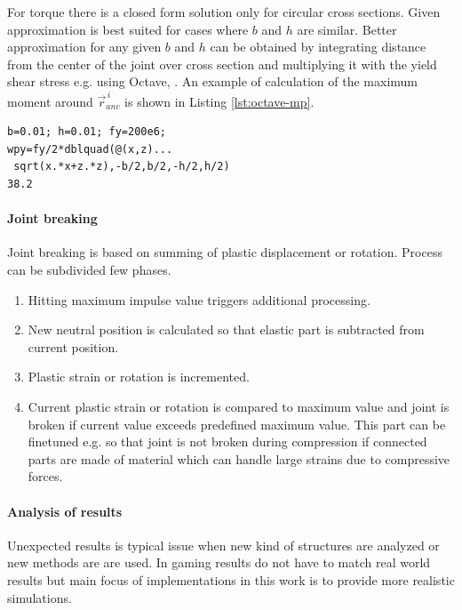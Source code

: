\documentclass{jcgt}
\begin{document}
For torque there is a closed form solution only for
circular cross sections.
Given approximation is 
best suited for cases where $b$ and $h$ are similar.
Better approximation for any given $b$ and $h$ can be obtained 
by integrating distance from the center of the joint over cross section and
multiplying it with the yield shear stress e.g. using Octave, \cite{octave}.
An example of calculation of the maximum moment  around $\vec{r}_{anc}^{\,i} $
is shown in Listing \ref{lst:octave-mp}.

\lstset{language=octave}
\begin{lstlisting}[caption={Calculation of maximum moment  around $\vec{r}_{anc}^{\,i} $ using Octave.}, 
label={lst:octave-mp}, float]
b=0.01; h=0.01; fy=200e6;
wpy=fy/2*dblquad(@(x,z)...
 sqrt(x.*x+z.*z),-b/2,b/2,-h/2,h/2)
38.2
\end{lstlisting}


\paragraph{Joint breaking}
Joint breaking is based on summing of plastic displacement or rotation.
Process can be subdivided few phases.

\begin{enumerate}
\item Hitting maximum impulse value triggers additional processing.
\item New neutral position is calculated so that elastic part is subtracted from current position.
\item Plastic strain or rotation is incremented.
\item Current plastic strain or rotation is compared to maximum value and joint is broken if 
current value exceeds predefined maximum value. This part can be finetuned e.g. so that joint is 
not broken during compression if connected parts are made of material which can handle large
strains due to compressive forces. 
\end{enumerate}

\paragraph{Analysis of results}
Unexpected results is typical issue when new kind of structures are analyzed or new methods are are
used. In gaming results do not have to match real world results but main focus of implementations
in this work is to provide more realistic simulations.
\end{document}
